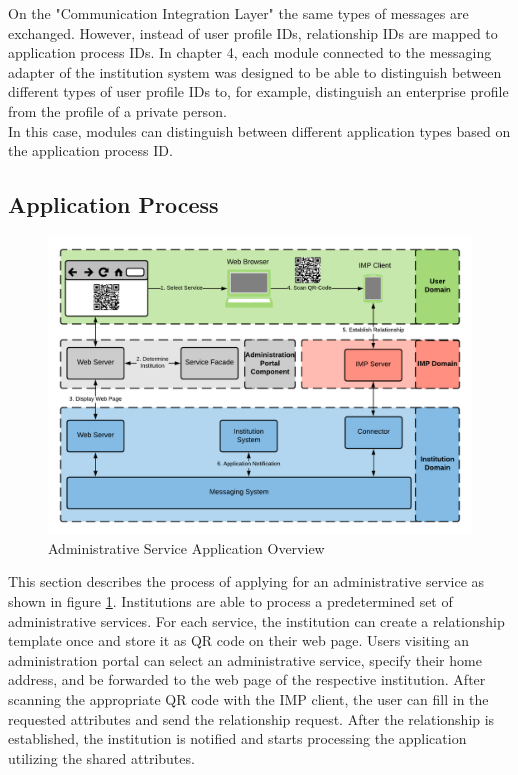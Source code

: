 On the "Communication Integration Layer" the same types of messages are exchanged. However, instead of user profile IDs, relationship IDs are mapped to application process IDs. In chapter 4, each module connected to the messaging adapter of the institution system was designed to be able to distinguish between different types of user profile IDs to, for example, distinguish an enterprise profile from the profile of a private person. \\
In this case, modules can distinguish between different application types based on the application process ID.

\subsection{Application Process}

\begin{figure}[H]
    \centering
    \includegraphics[scale=0.6]{Diagrams/Integration Architecture 2/Technological Integration/3. Application Overview.pdf}
    \caption{Administrative Service Application Overview}
    \label{integration2:application_overview}
\end{figure}
This section describes the process of applying for an administrative service as shown in figure \ref{integration2:application_overview}.
Institutions are able to process a predetermined set of administrative services. For each service, the institution can create a relationship template once and store it as QR code on their web page. 
Users visiting an administration portal can select an administrative service, specify their home address, and be forwarded to the web page of the respective institution. After scanning the appropriate QR code with the IMP client, the user can fill in the requested attributes and send the relationship request. After the relationship is established, the institution is notified and starts processing the application utilizing the shared attributes.

